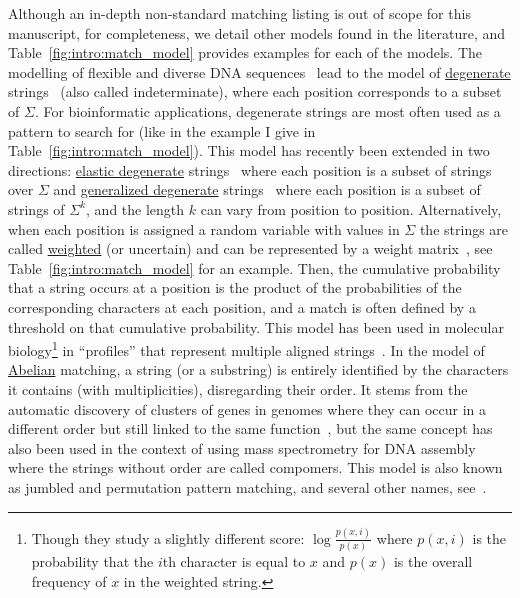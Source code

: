 Although an in-depth non-standard matching listing is out of scope for this manuscript, for completeness, we detail other models found in the literature, and Table~\ref{fig:intro:match_model} provides examples for each of the models.
The modelling of flexible and diverse DNA sequences~\cite{comm1970iupac} lead to the model of \underline{degenerate} strings~\cite{abrahamson1987generalized} (also called indeterminate), where each position corresponds to a subset of $\Sigma$. For bioinformatic applications, degenerate strings are most often used as a pattern to search for (like in the example I give in Table~\ref{fig:intro:match_model}). 
This model has recently been extended in two directions: \underline{elastic degenerate} strings~\cite{iliopoulos2021efficient} where each position is a subset of strings over $\Sigma$ and \underline{generalized degenerate} strings~\cite{alzamel_et_al:LIPIcs:2018:9323} where each position is a subset of strings of $\Sigma^k$, and the length $k$ can vary from position to position.
Alternatively, when each position is assigned a random variable with values in $\Sigma$ the strings are called \underline{weighted} (or uncertain) and can be represented by a weight matrix~\cite{thompson1994clustal}, see Table~\ref{fig:intro:match_model} for an example. Then, the cumulative probability that a string occurs at a position is the product of the probabilities of the corresponding characters at each position, and a match is often defined by a threshold on that cumulative probability. This model has been used in molecular biology\footnote{Though they study a slightly different score: $\log \frac{p(x,i)}{p(x)}$ where $p(x,i)$ is the probability that the $i$th character is equal to $x$ and $p(x)$ is the overall frequency of $x$ in the weighted string.} in ``profiles'' that represent multiple aligned strings~\cite{doi:10.1073/pnas.84.13.4355}. 
In the model of \underline{Abelian} matching, a string (or a substring) is entirely identified by the characters it contains (with multiplicities), disregarding their order. It stems from the automatic discovery of clusters of genes in genomes where they can occur in a different order but still linked to the same function~\cite{eres2004permutation}, but the same concept has also been used in the context  of using mass spectrometry for DNA assembly~\cite{bocker2003sequencing} where the strings without order are called compomers. This model is also known as jumbled and permutation pattern matching, and several other names, see~\cite{ejaz2010abelian}.
